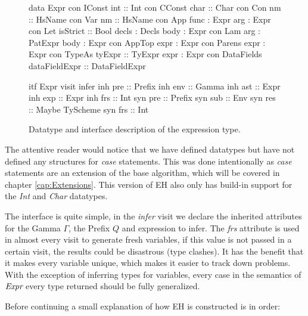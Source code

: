 \begin{figure}
\begin{minipage}[t]{0.5\linewidth}
\begin{code}
data Expr
  con IConst
    int           :: Int
  con CConst
    char          :: Char
  con Con
    nm            :: HsName
  con Var
    nm            :: HsName
  con App
    func          :  Expr
    arg           :  Expr
  con Let
    isStrict      :: Bool
    decls         :  Decls
    body          :  Expr
  con Lam
    arg           :  PatExpr
    body          :  Expr
  con AppTop
    expr          :  Expr
  con Parens
    expr          :  Expr
  con TypeAs
    tyExpr        :: TyExpr
    expr          :  Expr
  con DataFields
    dataFieldExpr :: DataFieldExpr
\end{code}
\end{minipage}
\begin{minipage}[t]{0.5\linewidth}
\begin{code}
itf Expr
  visit infer
    inh pre :: Prefix
    inh env :: Gamma
    inh ast :: Expr
    inh exp :: Expr
    inh frs :: Int
    syn pre :: Prefix
    syn sub :: Env
    syn res :: Maybe TyScheme
    syn frs :: Int
\end{code}
\end{minipage}
\caption{Datatype and interface description of the expression type.}
\label{abs:fig:tyexpr}
\end{figure}

The attentive reader would notice that we have defined datatypes but have not defined any structures for \emph{case} statements. This was done intentionally as \emph{case} statements are an extension of the base algorithm, which will be covered in chapter \ref{cap:Extensions}. This version of EH also only has build-in support for the \emph{Int} and \emph{Char} datatypes.

The interface is quite simple, in the \emph{infer} visit we declare the inherited attributes for the Gamma $\Gamma$, the Prefix $Q$ and expression to infer. The \emph{frs} attribute is used in almost every visit to generate fresh variables, if this value is not passed in a certain visit, the results could be disastrous (type clashes). It has the benefit that it makes every variable unique, which makes it easier to track down problems. With the exception of inferring types for variables, every case in the semantics of $\emph{Expr}$ every type returned should be fully generalized.

Before continuing a small explanation of how EH is constructed is in order:

